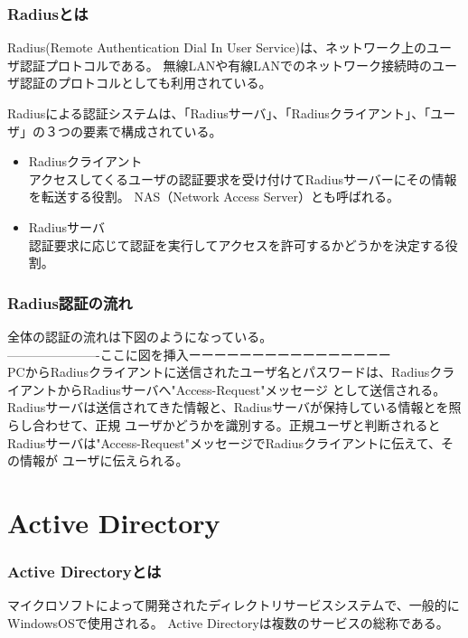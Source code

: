 \documentclass[12pt,a4paper,titlepage]{jreport}
\begin{document}
\subsubsection*{Radiusとは}
Radius(Remote Authentication Dial In User Service)は、ネットワーク上のユーザ認証プロトコルである。
無線LANや有線LANでのネットワーク接続時のユーザ認証のプロトコルとしても利用されている。


Radiusによる認証システムは、「Radiusサーバ」、「Radiusクライアント」、「ユーザ」の３つの要素で構成されている。

\begin{itemize}
    \item Radiusクライアント\mbox{}\\
    アクセスしてくるユーザの認証要求を受け付けてRadiusサーバーにその情報を転送する役割。
    NAS（Network Access Server）とも呼ばれる。
    \item Radiusサーバ\mbox{}\\
    認証要求に応じて認証を実行してアクセスを許可するかどうかを決定する役割。


\end{itemize}

\subsubsection*{Radius認証の流れ}
全体の認証の流れは下図のようになっている。\\
----------------------ここに図を挿入ーーーーーーーーーーーーーーーー\\

PCからRadiusクライアントに送信されたユーザ名とパスワードは、RadiusクライアントからRadiusサーバへ"Access-Request"メッセージ
として送信される。Radiusサーバは送信されてきた情報と、Radiusサーバが保持している情報とを照らし合わせて、正規
ユーザかどうかを識別する。正規ユーザと判断されるとRadiusサーバは"Access-Request"メッセージでRadiusクライアントに伝えて、その情報が
ユーザに伝えられる。


\section{Active Directory}
\subsubsection*{Active Directoryとは}
マイクロソフトによって開発されたディレクトリサービスシステムで、一般的にWindowsOSで使用される。
Active Directoryは複数のサービスの総称である。
\end{document}
